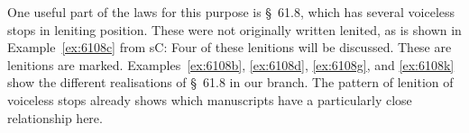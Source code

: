 One useful part of the laws for this purpose is §~61.8, which has several voiceless stops in leniting position. These were not originally written lenited, as is shown in Example~\ref{ex:6108c} from \gls{sC}:
Four of these lenitions will be discussed. These are lenitions are marked. Examples~\ref{ex:6108b}, \ref{ex:6108d}, \ref{ex:6108g}, and \ref{ex:6108k} show the different realisations of §~61.8 in our branch. The pattern of lenition of voiceless stops already shows which manuscripts have a particularly close relationship here. 
